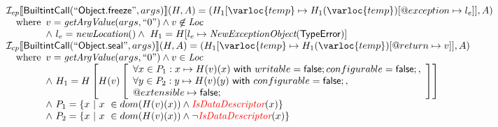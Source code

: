 \[\begin{array}{l}
\I _{cp}\lbr \SF{BuiltintCall}(``\SF{Object.freeze}",args)\rbr(H,A)
 = (H_1[\varloc{temp}\mapsto H_1(\varloc{temp})[\varprop{exception}\mapsto l_{e}]], A) \\
\quad\wherec{
  v = \hf{getArgValue}(args, ``0") \land v\not\in\Loc\\
  \land\ l_e = \hf{newLocation}() \land\ H_1=H[l_e\mapsto\hf{NewExceptionObject}(\SF{TypeError})] }\\
  
\I _{cp}\lbr \SF{BuiltintCall}(``\SF{Object.seal}",args)\rbr(H,A)
 = (H_1[\varloc{temp}\mapsto H_1(\varloc{temp})[\varprop{return}\mapsto v]], A) \\
\quad\wherec{
  v = \hf{getArgValue}(args, ``0") \land v  \in\Loc\\
  \land\ H_1 = H\left[ H(v)\left[
    \begin{array}{l}
      \forall x\in P_1 : x \mapsto H(v)(x)\rwith writable=\SF{false};configurable=\SF{false};, \\
      \forall y\in P_2 : y \mapsto H(v)(y)\rwith configurable=\SF{false};, \\
      \varprop{extensible} \mapsto \SF{false};
    \end{array}\right]\right]\\
  \land\ P_1 = \{ x\ |\ x\ \in dom(H(v)(x)) \land \hf{\inred IsDataDescriptor}(x) \} \\
  \land\ P_2 = \{ x\ |\ x\ \in dom(H(v)(x)) \land \neg\hf{\inred IsDataDescriptor}(x) \}
  }\\
\\\\

\end{array}
\]



